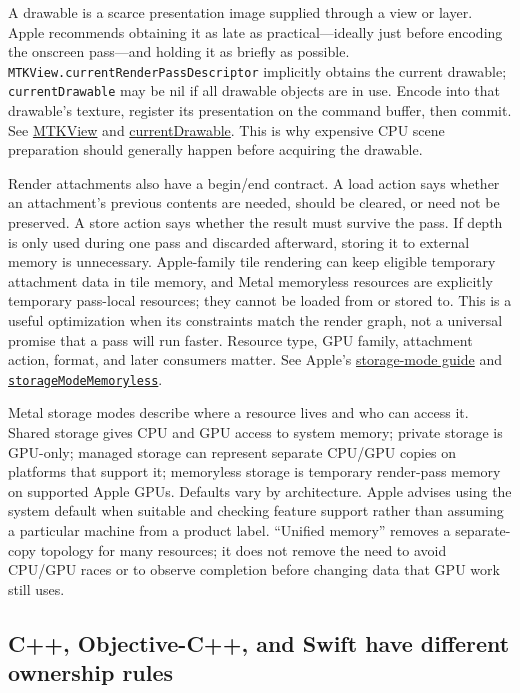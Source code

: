 A drawable is a scarce presentation image supplied through a view or layer. Apple recommends obtaining it as late as practical---ideally just before encoding the onscreen pass---and holding it as briefly as possible. \texttt{MTKView.currentRenderPassDescriptor} implicitly obtains the current drawable; \texttt{currentDrawable} may be nil if all drawable objects are in use. Encode into that drawable's texture, register its presentation on the command buffer, then commit. See \href{https://developer.apple.com/documentation/metalkit/mtkview/}{MTKView} and \href{https://developer.apple.com/documentation/MetalKit/MTKView/currentDrawable}{currentDrawable}. This is why expensive CPU scene preparation should generally happen before acquiring the drawable.

Render attachments also have a begin/end contract. A load action says whether an attachment's previous contents are needed, should be cleared, or need not be preserved. A store action says whether the result must survive the pass. If depth is only used during one pass and discarded afterward, storing it to external memory is unnecessary. Apple-family tile rendering can keep eligible temporary attachment data in tile memory, and Metal memoryless resources are explicitly temporary pass-local resources; they cannot be loaded from or stored to. This is a useful optimization when its constraints match the render graph, not a universal promise that a pass will run faster. Resource type, GPU family, attachment action, format, and later consumers matter. See Apple's \href{https://developer.apple.com/documentation/metal/setting-resource-storage-modes}{storage-mode guide} and \href{https://developer.apple.com/documentation/metal/mtlresourceoptions/storagemodememoryless}{\texttt{storageModeMemoryless}}.

Metal storage modes describe where a resource lives and who can access it. Shared storage gives CPU and GPU access to system memory; private storage is GPU-only; managed storage can represent separate CPU/GPU copies on platforms that support it; memoryless storage is temporary render-pass memory on supported Apple GPUs. Defaults vary by architecture. Apple advises using the system default when suitable and checking feature support rather than assuming a particular machine from a product label. ``Unified memory'' removes a separate-copy topology for many resources; it does not remove the need to avoid CPU/GPU races or to observe completion before changing data that GPU work still uses.

\subsection{C++, Objective-C++, and Swift have different ownership rules}\label{05-engine-i-ch019-c-objective-c-and-swift-have-different-ownership-rules}

